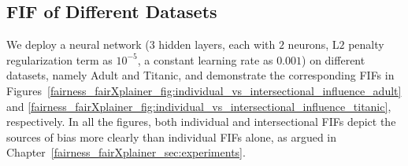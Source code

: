 \subsection{FIF of Different Datasets}
We deploy a neural network ($ 3 $ hidden layers, each with $ 2 $ neurons, L$ 2 $ penalty regularization term as $ 10^{-5} $, a constant learning rate as $ 0.001 $) on different datasets, namely Adult and Titanic, and demonstrate the corresponding FIFs in Figures~\ref{fairness_fairXplainer_fig:individual_vs_intersectional_influence_adult} and \ref{fairness_fairXplainer_fig:individual_vs_intersectional_influence_titanic}, respectively. In all the figures, both individual and intersectional FIFs depict the sources of bias more clearly than individual FIFs alone, as argued in Chapter~\ref{fairness_fairXplainer_sec:experiments}. 



